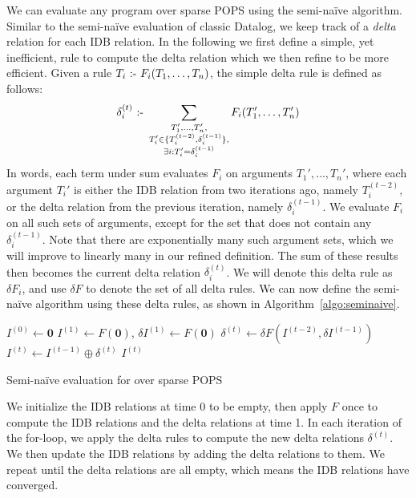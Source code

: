 We can evaluate any \datalogo program over sparse POPS using 
 the semi-na\"ive algorithm. 
Similar to the semi-na\"ive evaluation of classic Datalog, 
 we keep track of a {\em delta} relation for each IDB relation.
In the following we first define a simple, yet inefficient, 
 rule to compute the delta relation
 which we then refine to be more efficient. 
Given a rule $T_i \text{ :- } F_i(T_1, \ldots, T_n)$, 
 the simple delta rule is defined as follows: 
%
$$\delta_i^{(t)} \text{ :- } \sum_{
  \substack{
   T_1', \dots, T_n', \\ 
   T_i' \in \{T_i^{(t-2)}, \delta_i^{(t-1)}\}, \\ 
   \exists i : T_i' = \delta_i^{(t-1)} 
   }}
  F_i(T_1', \ldots, T_n') $$
%
In words, each term under sum evaluates $F_i$ on arguments $T_1', \ldots, T_n'$, 
 where each argument $T_i'$ is either the IDB relation from two iterations ago, 
 namely $T_i^{(t-2)}$, or the delta relation from the previous iteration,
 namely $\delta_i^{(t-1)}$.
We evaluate $F_i$ on all such sets of arguments, 
 except for the set that does not contain any $\delta_i^{(t-1)}$.
Note that there are exponentially many such argument sets, 
 which we will improve to linearly many in our refined definition.
The sum of these results then becomes the current delta relation $\delta_i^{(t)}$.
We will denote this delta rule as $\delta F_i$,
 and use $\delta F$ to denote the set of all delta rules.
We can now define the semi-na\"ive algorithm using these delta rules, 
 as shown in Algorithm~\ref{algo:seminaive}.
%
\begin{algorithm}[t]
  $I^{(0)} \leftarrow \bm 0$\;
  $I^{(1)} \leftarrow F(\bm 0)$, $\delta I^{(1)} \gets F(\bm 0)$ \;
 {
     {$\delta^{(t)} \leftarrow \delta F(I^{(t-2)}, \delta I^{(t-1)})$} \label{algo:sn:delta} \; 
     {$I^{(t)} \leftarrow I^{(t-1)} \oplus \delta^{(t)}$}\;
 }
 \Return $I^{(t)}$
 \caption{Semi-na\"ive evaluation for \datalogo over sparse POPS}
 \label{algo:seminaive}
\end{algorithm}
%
We initialize the IDB relations at time $0$ to be empty, 
 then apply $F$ once to compute the IDB relations and the delta relations 
 at time 1.
In each iteration of the for-loop, we apply the delta rules to compute the 
 new delta relations $\delta^{(t)}$.
We then update the IDB relations by adding the delta relations to them. 
We repeat until the delta relations are all empty, 
 which means the IDB relations have converged.


